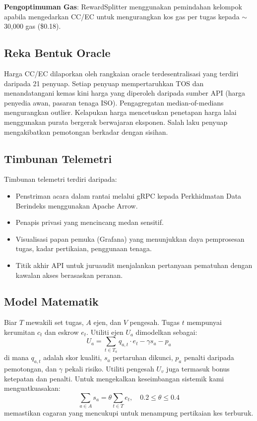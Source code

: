 \documentclass[11pt]{article}
\begin{document}
\textbf{Pengoptimuman Gas}: RewardSplitter menggunakan pemindahan kelompok apabila mengedarkan CC/EC untuk mengurangkan kos gas per tugas kepada $\sim$30,000 gas (\$0.18).

\subsection{Reka Bentuk Oracle}
Harga CC/EC dilaporkan oleh rangkaian oracle terdesentralisasi yang terdiri daripada 21 penyuap. Setiap penyuap mempertaruhkan TOS dan menandatangani kemas kini harga yang diperoleh daripada sumber API (harga penyedia awan, pasaran tenaga ISO). Pengagregatan median-of-medians mengurangkan outlier. Kelapukan harga mencetuskan penetapan harga lalai menggunakan purata bergerak berwajaran eksponen. Salah laku penyuap mengakibatkan pemotongan berkadar dengan sisihan.

\subsection{Timbunan Telemetri}
Timbunan telemetri terdiri daripada:
\begin{itemize}[noitemsep]
  \item Penstriman acara dalam rantai melalui gRPC kepada Perkhidmatan Data Berindeks menggunakan Apache Arrow.
  \item Penapis privasi yang mencincang medan sensitif.
  \item Visualisasi papan pemuka (Grafana) yang menunjukkan daya pemprosesan tugas, kadar pertikaian, penggunaan tenaga.
  \item Titik akhir API untuk juruaudit menjalankan pertanyaan pematuhan dengan kawalan akses berasaskan peranan.
\end{itemize}

\subsection{Model Matematik}
Biar $T$ mewakili set tugas, $A$ ejen, dan $V$ pengesah. Tugas $t$ mempunyai kerumitan $c_t$ dan eskrow $e_t$. Utiliti ejen $U_a$ dimodelkan sebagai:
\begin{equation}
U_a = \sum_{t \in T_a} q_{a,t}\cdot e_t - \gamma s_a - p_a\label{eq:agent-utility}
\end{equation}
di mana $q_{a,t}$ adalah skor kualiti, $s_a$ pertaruhan dikunci, $p_a$ penalti daripada pemotongan, dan $\gamma$ pekali risiko. Utiliti pengesah $U_v$ juga termasuk bonus ketepatan dan penalti. Untuk mengekalkan keseimbangan sistemik kami menguatkuasakan:
\begin{equation}
\sum_{a \in A} s_a = \theta \sum_{t \in T} e_t,\quad 0.2 \leq \theta \leq 0.4
\end{equation}
memastikan cagaran yang mencukupi untuk menampung pertikaian kes terburuk.
\end{document}

